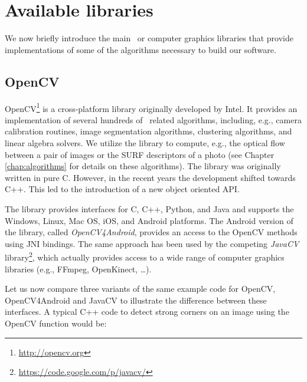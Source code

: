 \section{Available libraries}
\label{lib} 

We now briefly introduce the main \cv\ or computer graphics libraries that provide implementations of some of the algorithms necessary to build our software. %


\subsection{OpenCV} 

OpenCV\footnote{\url{http://opencv.org}} is a cross-platform library originally developed by Intel. 
It provides an implementation of several hundreds of \cv\ related algorithms, 
including, e.g., camera calibration routines, image segmentation algorithms, clustering algorithms, and linear algebra solvers.
We utilize the library to compute, e.g., the optical flow between a pair of images or the SURF descriptors of a photo (see Chapter \ref{chap:algorithms} for details on these algorithms).
The library was originally written in pure C. 
However, in the recent years the development shifted towards C++. 
This led to the introduction of a new object oriented API. 

The library provides interfaces for C, C++, Python, and Java and supports the Windows, Linux, Mac OS, iOS, and Android platforms. 
The Android version of the library, called {\it OpenCV4Android}, provides an access to the OpenCV methods using JNI bindings.
The same approach has been used by the competing {\it JavaCV} library\footnote{\url{https://code.google.com/p/javacv/}}, which actually provides access to a wide range of computer graphics libraries (e.g., FFmpeg, OpenKinect, \dots). 

Let us now compare three variants of the same example code for OpenCV, OpenCV4Android and JavaCV to illustrate the difference between these interfaces.
A typical C++ code to detect strong corners on an image using the OpenCV function  would be: 

